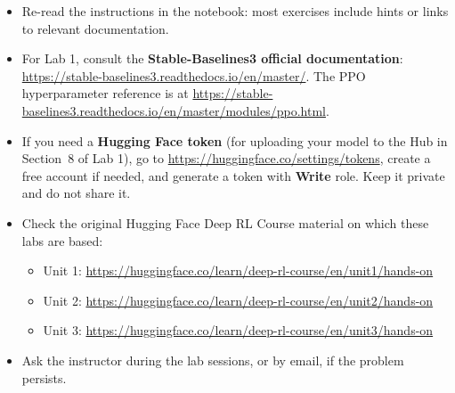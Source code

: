 \documentclass[11pt,a4paper]{article}
\begin{document}
\begin{itemize}
    \item Re-read the instructions in the notebook: most exercises include hints or links to relevant documentation.
    \item For Lab 1, consult the \textbf{Stable-Baselines3 official documentation}: \\ \url{https://stable-baselines3.readthedocs.io/en/master/}. The PPO hyperparameter reference is at \url{https://stable-baselines3.readthedocs.io/en/master/modules/ppo.html}.
    \item If you need a \textbf{Hugging Face token} (for uploading your model to the Hub in Section~8 of Lab 1), go to \url{https://huggingface.co/settings/tokens}, create a free account if needed, and generate a token with \textbf{Write} role. Keep it private and do not share it.
    \item Check the original Hugging Face Deep RL Course material on which these labs are based:
    \begin{itemize}
        \item Unit 1: \url{https://huggingface.co/learn/deep-rl-course/en/unit1/hands-on}
        \item Unit 2: \url{https://huggingface.co/learn/deep-rl-course/en/unit2/hands-on}
        \item Unit 3: \url{https://huggingface.co/learn/deep-rl-course/en/unit3/hands-on}
    \end{itemize}
    \item Ask the instructor during the lab sessions, or by email, if the problem persists.
\end{itemize}
\end{document}
